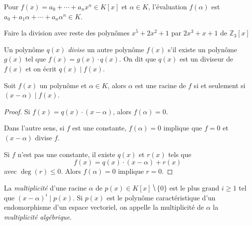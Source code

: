 \begin{definition}
  Pour $f(x)  = a_0 + \cdots + a_n x^n \in K[x]$ et $\alpha \in K$, l'évaluation $f(\alpha)$ est $ a_0 + a_1 \alpha + \cdots + a_n \alpha^n \in K$. 
\end{definition}


\begin{example}
  \label{exe:24}
  Faire la division avec reste des polynômes  $x^5+2x^2+1$ par $2x^3+x+1$ de $ℤ_3[x]$ 
\end{example}



\begin{definition}
  \label{def:32}
  Un polynôme  $q(x)$ \emph{divise} un autre polynôme $f(x)$ s'il existe un polynôme $g(x)$ tel que $f(x) = g(x) \cdot q(x)$. On dit que $q(x)$ est un diviseur de $f(x)$ et on écrit $q(x) \mid f(x)$. 
\end{definition}

\begin{theorem}
  \label{thr:35}
  Soit $f(x)$ un polynôme  et $\alpha \in K$, alors $\alpha$ est une racine de $f$ si et seulement si $(x- \alpha)  \mid f(x)$. 
\end{theorem}

\begin{proof}
  Si $f(x) = q(x) \cdot (x - \alpha)$, alors $f(\alpha) = 0$. 

Dans l'autre sens, si $f$ est une constante, $f(\alpha) = 0$ implique que $f = 0$ et $(x - \alpha)$ divise $f$. 

Si $f$ n'est pas une constante, il existe $q(x)$ et $r(x)$ tels que
\begin{displaymath}
  f(x) = q(x) \cdot (x - \alpha) + r(x)
\end{displaymath}
avec $\deg(r) \leq 0$. Alors $f(\alpha) = 0$ implique $r=0$. 
\end{proof}


\begin{definition}
  \label{def:41}
  La \emph{multiplicité} d'une racine $α$ de $p(x) ∈ K[x] ⧹\{0\}$ est le plus grand $i≥1$ tel que $ (x-α)^i \mid p(x)$. Si $p(x)$ est le polynôme caractéristique d'un endomorphisme d'un espace vectoriel, on appelle la multiplicité de $α$ la \emph{multiplicité algébrique}. 
\end{definition} 



